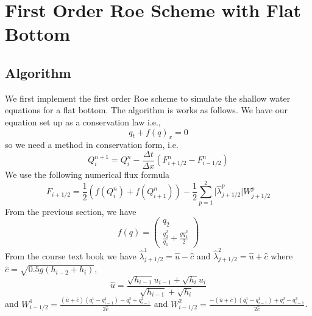 \section{First Order Roe Scheme with Flat Bottom}
\subsection{Algorithm}
We first implement the first order Roe scheme to simulate the shallow water equations for a flat bottom. The algorithm is works as follows. We have our equation set up as a conservation law i.e.,
$$q_t+f(q)_x=0$$
so we need a method in conservation form, i.e.
$$Q_i^{n+1} = Q_i^n - \frac{\Delta t}{\Delta x}(F^n_{i+1/2}-F^n_{i-1/2})$$ 
We use the following numerical flux formula
$$F_{i+1/2}=\frac{1}{2}(f(Q_i^n)+f(Q_{i+1}^n))-\frac{1}{2}\sum_{p=1}^2 \lvert \hat{\lambda}_{j+1/2}^p \rvert W_{j+1/2}^p$$
From the previous section, we have 
$$f(q) = \begin{pmatrix}
q_2\\ \frac{q_2^2}{q_1} + \frac{gq_1^2}{2}
\end{pmatrix}$$
From the course text book we have $\hat{\lambda}^1_{j+1/2} = \hat{u}-\hat{c}$ and $\hat{\lambda}^2_{j+1/2} = \hat{u}+\hat{c}$ where $\hat{c}=\sqrt{0.5g(h_{i-2}+h_i)}$,
$$\hat{u}=\frac{\sqrt{h_{i-1}}u_{i-1}+\sqrt{h_i}u_i}{\sqrt{h_{i-1}}+\sqrt{h_i}}$$ 
and $W^1_{i-1/2}=\frac{(\hat{u}+\hat{c})(q_i^1-q_{i-1}^1) - q_i^2+q_{i-1}^2}{2\hat{c}}$ and $W^2_{i-1/2}=\frac{-(\hat{u}+\hat{c})(q_i^1-q_{i-1}^1) + q_i^2-q_{i-1}^2}{2\hat{c}}$.
